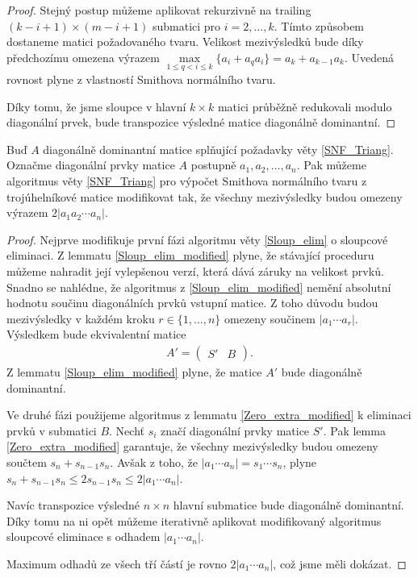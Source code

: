 \begin{proof}
Stejný postup můžeme aplikovat rekurzivně na trailing
$ (k - i + 1) \times (m - i + 1) $ submatici pro $ i = 2,\dots, k $. Tímto 
způsobem dostaneme matici požadovaného tvaru. Velikost mezivýsledků bude 
díky předchozímu omezena výrazem 
$ \max\limits_{1 \leq q < i \leq k}\{ a_i + a_q a_i \} = a_k + a_{k - 1} a_k $.
Uvedená rovnost plyne z vlastností Smithova normálního tvaru. 

Díky tomu, že jsme sloupce v hlavní $ k \times k $ matici průběžně redukovali
modulo diagonální prvek, bude transpozice výsledné matice diagonálně dominantní.
\end{proof}

\begin{vet}
Buď $ A $ diagonálně dominantní matice splňující požadavky věty \ref{SNF_Triang}.
Označme diagonální prvky matice $ A $ postupně $ a_1, a_2, \dots, a_n $.
Pak můžeme algoritmus věty \ref{SNF_Triang} pro výpočet Smithova normálního 
tvaru z trojúhelníkové matice modifikovat tak, že všechny mezivýsledky budou 
omezeny výrazem $ 2 |a_1 a_2 \cdots a_n| $.
\end{vet}
\begin{proof}
Nejprve modifikuje první fázi algoritmu věty \ref{Sloup_elim} o sloupcové 
eliminaci. Z lemmatu \ref{Sloup_elim_modified} plyne, že stávající proceduru 
můžeme nahradit její vylepšenou verzí, která dává záruky na velikost prvků. 
Snadno se nahlédne, že  algoritmus z \ref{Sloup_elim_modified} nemění absolutní 
hodnotu součinu  diagonálních prvků vstupní matice. Z toho důvodu budou 
mezivýsledky v  každém kroku $ r \in \{1, \dots, n \} $ omezeny součinem 
$ |a_1 \cdots a_r| $.
Výsledkem bude ekvivalentní matice
\begin{align*}
A' =
    \left(
    \begin{array}{c|c}
        S' & B
    \end{array}
    \right)
.
\end{align*}
Z lemmatu \ref{Sloup_elim_modified} plyne, že matice $ A' $ bude diagonálně
dominantní.

Ve druhé fázi použijeme algoritmus z lemmatu \ref{Zero_extra_modified}
k eliminaci prvků v submatici $ B $. Nechť $ s_i $ značí diagonální prvky matice 
$ S' $. Pak lemma \ref{Zero_extra_modified} garantuje, že všechny mezivýsledky 
budou omezeny součtem $ s_n + s_{n - 1} s_n $. Avšak z toho, že 
$ |a_1 \cdots a_n| = s_1 \cdots s_n $, plyne 
$ s_n + s_{n - 1} s_n \leq 2 s_{n - 1} s_n \leq 2 |a_1 \cdots a_n| $.

Navíc transpozice výsledné $ n \times n $ hlavní submatice bude diagonálně 
dominantní. Díky tomu na ni opět můžeme iterativně aplikovat modifikovaný 
algoritmus sloupcové eliminace s odhadem $ |a_1 \cdots a_n| $.

Maximum odhadů ze všech tří částí je rovno $ 2 |a_1 \cdots a_n| $, což jsme měli
dokázat.
\end{proof}








